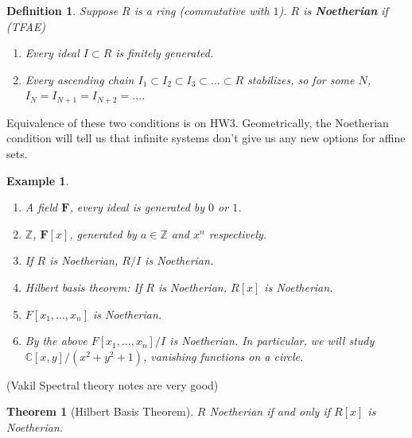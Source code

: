 \documentclass[12pt]{article}
\newcommand{\F}{\mathbf{F}}
\newcommand{\C}{\mathbb{C}}
\newcommand{\Z}{\mathbb{Z}}
\newtheorem{definition}{Definition}[section]
\newtheorem*{example}{Example}
\newtheorem{theorem}{Theorem}[section]
\begin{document}
    \begin{definition}
        Suppose $R$ is a ring (commutative with $1$). $R$ is \textbf{Noetherian} if (TFAE)
        \begin{enumerate}
            \item Every ideal $I \subset R$ is finitely generated.
            \item Every ascending chain $I_1 \subset I_2 \subset I_3 \subset \dots \subset R$ stabilizes, so for some $N$, $I_{N} = I_{N+1} = I_{N+2} = \dots$.
        \end{enumerate}
    \end{definition}
    Equivalence of these two conditions is on HW3. Geometrically, the Noetherian condition will tell us that infinite systems don't give us any new options for affine sets. \par
    \begin{example}
        \begin{enumerate}
            \item A field $\F$, every ideal is generated by $0$ or $1$.
            \item $\Z$, $\F[x]$, generated by $a \in \Z$ and $x^n$ respectively.
            \item If $R$ is Noetherian, $R/I$ is Noetherian.
            \item Hilbert basis theorem: If $R$ is Noetherian, $R[x]$ is Noetherian.
            \item $F[x_1, \dots, x_n]$ is Noetherian.
            \item By the above $F[x_1, \dots, x_n]/I$ is Noetherian. In particular, we will study $\C[x, y]/(x^2 + y^2 + 1)$, vanishing functions on a circle.
        \end{enumerate}
    \end{example}
    (Vakil Spectral theory notes are very good)\par
    \begin{theorem}
        [Hilbert Basis Theorem] $R$ Noetherian if and only if $R[x]$ is Noetherian.
    \end{theorem}
\end{document}
